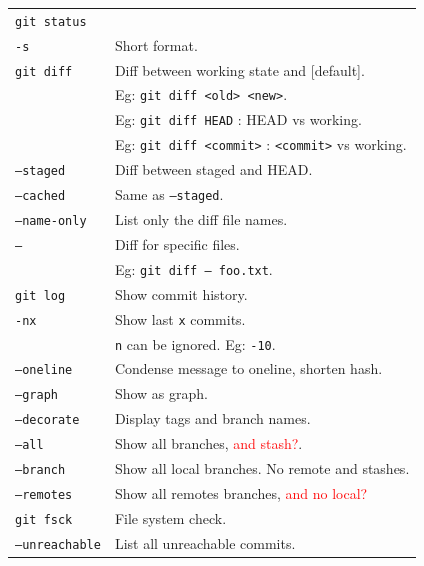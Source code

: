 \begin{tabularx}{\linewidth}{lX}
\hline
    \texttt{git status}     & \\
    \texttt{-s}             & Short format.\\
\hline
    \texttt{git diff}       & Diff between working state and [default].\\
                            & Eg: \texttt{git diff <old> <new>}.\\
                            & Eg: \texttt{git diff HEAD} : HEAD vs working.\\
                            & Eg: \texttt{git diff <commit>} :
                                            \texttt{<commit>} vs working.\\
    \texttt{--staged}       & Diff between staged and HEAD.\\
    \texttt{--cached}       & Same as \texttt{--staged}.\\
    \texttt{--name-only}    & List only the diff file names.\\
    \texttt{-- }            & Diff for specific files.\\
                            & Eg: \texttt{git diff -- foo.txt}.\\
\hline
    \texttt{git log}        & Show commit history.\\
    \texttt{-nx}            & Show last \texttt{x} commits. \\
                            & \texttt{n} can be ignored. Eg: \texttt{-10}.\\
    \texttt{--oneline}      & Condense message to oneline, shorten hash.\\
    \texttt{--graph}        & Show as graph.\\
    \texttt{--decorate}     & Display tags and branch names.\\
    \texttt{--all}          & Show all branches, \textcolor{red}{and stash?}.\\
    \texttt{--branch}       & Show all local branches. No remote and stashes.\\
    \texttt{--remotes}      & Show all remotes branches,
                               \textcolor{red}{and no local?}\\
\hline
    \texttt{git fsck}       & File system check.\\
    \texttt{--unreachable}  & List all unreachable commits.\\
\end{tabularx}


